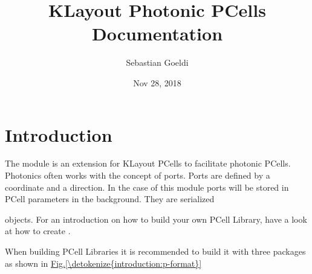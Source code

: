 \documentclass[a4paper,10pt,english]{sphinxmanual}
\title{KLayout Photonic PCells Documentation}
\date{Nov 28, 2018}
\author{Sebastian Goeldi}
\begin{document}
\pagestyle{empty}
\maketitle
\pagestyle{plain}
\sphinxtableofcontents
\pagestyle{normal}
\label{\detokenize{index::doc}}



\chapter{Introduction}
\label{\detokenize{introduction:introduction}}\label{\detokenize{introduction::doc}}
The  module is an extension for KLayout PCells to facilitate photonic PCells.
Photonics often works with the concept of ports.
Ports are defined by a coordinate and a direction. In the case of this module ports will be stored in PCell parameters in the background.
They are serialized %
\begin{footnote}[1]\sphinxAtStartFootnote
{}
%
\end{footnote} objects. For an introduction on how to build your own PCell Library, have a look at
how to create {\hyperref[\detokenize{example_library::doc}]{}}.

When building PCell Libraries it is recommended to build it with three packages as shown in \hyperref[\detokenize{introduction:p-format}]{Fig.\@ \ref{\detokenize{introduction:p-format}}}
\end{document}
